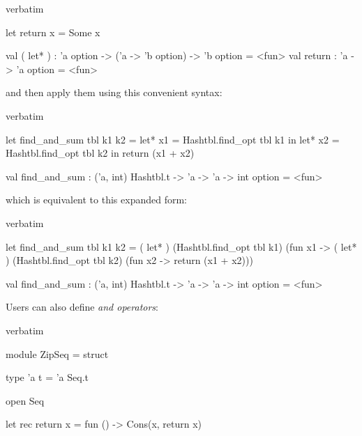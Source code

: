 {\begin{camlexample}{verbatim}
\begin{caml}
\begin{camlinput}
let return x = Some x
\end{camlinput}
\begin{camloutput}
val ( let* ) : 'a option -> ('a -> 'b option) -> 'b option = <fun>
val return : 'a -> 'a option = <fun>
\end{camloutput}
\end{caml}
\end{camlexample}

and then apply them using this convenient syntax:

\begin{camlexample}{verbatim}
\begin{caml}
\begin{camlinput}
let find_and_sum tbl k1 k2 =
  let* x1 = Hashtbl.find_opt tbl k1 in
  let* x2 = Hashtbl.find_opt tbl k2 in
    return (x1 + x2)
\end{camlinput}
\begin{camloutput}
val find_and_sum : ('a, int) Hashtbl.t -> 'a -> 'a -> int option = <fun>
\end{camloutput}
\end{caml}
\end{camlexample}

which is equivalent to this expanded form:

\begin{camlexample}{verbatim}
\begin{caml}
\begin{camlinput}
let find_and_sum tbl k1 k2 =
  ( let* ) (Hashtbl.find_opt tbl k1)
    (fun x1 ->
       ( let* ) (Hashtbl.find_opt tbl k2)
         (fun x2 -> return (x1 + x2)))
\end{camlinput}
\begin{camloutput}
val find_and_sum : ('a, int) Hashtbl.t -> 'a -> 'a -> int option = <fun>
\end{camloutput}
\end{caml}
\end{camlexample}

Users can also define {\em and operators}:

\begin{camlexample}{verbatim}
\begin{caml}
\begin{camlinput}
module ZipSeq = struct

  type 'a t = 'a Seq.t

  open Seq

  let rec return x =
    fun () -> Cons(x, return x)


\end{camlinput}
\end{caml}
\end{camlexample}}
